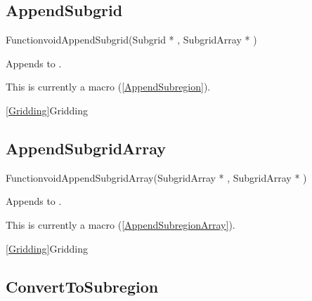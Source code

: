 \newpage
\subsection{AppendSubgrid}
\label{AppendSubgrid}


\begin{deftypefn}{Function}{void}{AppendSubgrid}({Subgrid *} , {SubgridArray *} )

\DESCRIPTION
Appends  to .

\NOTES
This is currently a macro (\ref{AppendSubregion}).

\SEEALSO
\vref{Gridding}{Gridding}

\end{deftypefn}


\newpage
\subsection{AppendSubgridArray}
\label{AppendSubgridArray}


\begin{deftypefn}{Function}{void}{AppendSubgridArray}({SubgridArray *} , {SubgridArray *} )

\DESCRIPTION
Appends  to .

\NOTES
This is currently a macro (\ref{AppendSubregionArray}).

\SEEALSO
\vref{Gridding}{Gridding}

\end{deftypefn}


\newpage
\subsection{ConvertToSubregion}
\label{ConvertToSubregion}

